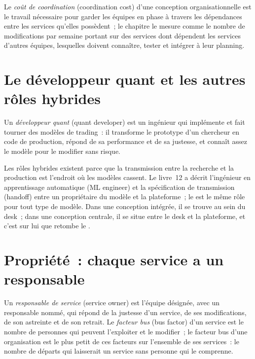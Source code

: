 \begin{definition}\label{def:fm:engineering-organisation-design:coord}
Le \emph{coût de coordination} (coordination cost) d'une conception organisationnelle est le travail nécessaire pour garder les équipes en phase à travers les dépendances
entre les services qu'elles possèdent~; le chapitre le mesure comme le nombre de modifications par semaine portant sur des services dont dépendent les services d'autres équipes, lesquelles
doivent connaître, tester et intégrer à leur planning.
\end{definition}

\section{Le développeur quant et les autres rôles hybrides}

\begin{definition}\label{def:fm:engineering-organisation-design:qd}
Un \emph{développeur quant} (quant developer) est un ingénieur qui implémente et fait tourner des modèles de trading~: il transforme le prototype d'un chercheur en
code de production, répond de sa performance et de sa justesse, et connaît assez le modèle pour le modifier sans risque.
\end{definition}

Les rôles hybrides existent parce que la transmission entre la recherche et la production est l'endroit où les modèles cassent. Le livre~12 a décrit l'ingénieur en apprentissage automatique (ML engineer)
et la spécification de transmission (handoff) entre un propriétaire du modèle et la plateforme~; le  est le même rôle pour tout type de modèle. Dans une conception
intégrée, il se trouve au sein du desk~; dans une conception centrale, il se situe entre le desk et la plateforme, et c'est sur lui que retombe le .

\section{Propriété~: chaque service a un responsable}

\begin{definition}\label{def:fm:engineering-organisation-design:owner}
Un \emph{responsable de service} (service owner) est l'équipe désignée, avec un responsable nommé, qui répond de la justesse d'un service, de ses modifications, de son astreinte et
de son retrait. Le \emph{facteur bus} (bus factor) d'un service est le nombre de personnes qui peuvent l'exploiter et le modifier~; le facteur bus d'une
organisation est le plus petit de ces facteurs sur l'ensemble de ses services~: le nombre de départs qui laisserait un service sans personne qui le comprenne.
\end{definition}

